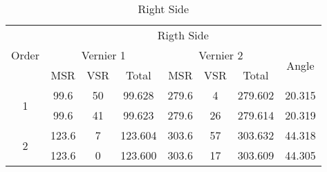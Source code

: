 \begin{table}[ht]
	\centering
	\begin{tabular}{|c|ccccccc|}
		\hline
		\multirow{3}{*}{Order}       &
		\multicolumn{7}{c|}{Rigth   Side}  \\ \cline{2-8}
		                                 &
		\multicolumn{3}{c|}{Vernier   1} &
		\multicolumn{3}{c|}{Vernier 2}   &
		\multirow{2}{*}{Angle}          \\ \cline{2-7}
		                                 &
		\multicolumn{1}{c|}{MSR}         &
		\multicolumn{1}{c|}{VSR}         &
		\multicolumn{1}{c|}{Total}       &
		\multicolumn{1}{c|}{MSR}         &
		\multicolumn{1}{c|}{VSR}         &
		\multicolumn{1}{c|}{Total}       &
		\\ \hline
		\multirow{2}{*}{1}               &
		\multicolumn{1}{c|}{99.6}        &
		\multicolumn{1}{c|}{50}          &
		\multicolumn{1}{c|}{99.628}      &
		\multicolumn{1}{c|}{279.6}       &
		\multicolumn{1}{c|}{4}           &
		\multicolumn{1}{c|}{279.602}     &
		20.315                             \\ \cline{2-8}
		                                 &
		\multicolumn{1}{c|}{99.6}        &
		\multicolumn{1}{c|}{41}          &
		\multicolumn{1}{c|}{99.623}      &
		\multicolumn{1}{c|}{279.6}       &
		\multicolumn{1}{c|}{26}          &
		\multicolumn{1}{c|}{279.614}     &
		20.319                             \\ \hline
		\multirow{2}{*}{2}               &
		\multicolumn{1}{c|}{123.6}       &
		\multicolumn{1}{c|}{7}           &
		\multicolumn{1}{c|}{123.604}     &
		\multicolumn{1}{c|}{303.6}       &
		\multicolumn{1}{c|}{57}          &
		\multicolumn{1}{c|}{303.632}     &
		44.318                             \\ \cline{2-8}
		                                 &
		\multicolumn{1}{c|}{123.6}       &
		\multicolumn{1}{c|}{0}           &
		\multicolumn{1}{c|}{123.600}     &
		\multicolumn{1}{c|}{303.6}       &
		\multicolumn{1}{c|}{17}          &
		\multicolumn{1}{c|}{303.609}     &
		44.305                             \\ \hline
	\end{tabular}
	\caption{Right Side}
	\label{table:r}
\end{table}